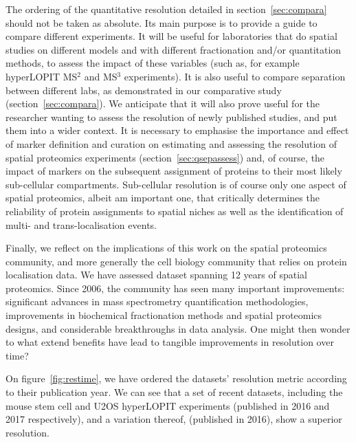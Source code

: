 \documentclass[12pt]{article}\usepackage[]{graphicx}\usepackage[]{color}
\begin{document}
The ordering of the quantitative resolution detailed in
section~\ref{sec:compara} should not be taken as absolute. Its main
purpose is to provide a guide to compare different experiments. It
will be useful for laboratories that do spatial studies on different
models and with different fractionation and/or quantitation methods,
to assess the impact of these variables (such as, for example
hyperLOPIT MS$^2$ and MS$^3$ experiments). It is also useful to
compare separation between different labs, as demonstrated in our
comparative study (section~\ref{sec:compara}). We anticipate that it
will also prove useful for the researcher wanting to assess the
resolution of newly published studies, and put them into a wider
context. It is necessary to emphasise the importance and effect of
marker definition and curation on estimating and assessing the
resolution of spatial proteomics experiments
(section~\ref{sec:qsepassess}) and, of course, the impact of markers
on the subsequent assignment of proteins to their most likely
sub-cellular compartments. Sub-cellular resolution is of course only
one aspect of spatial proteomics, albeit am important one, that
critically determines the reliability of protein assignments to
spatial niches as well as the identification of multi- and
trans-localisation events.

\bigskip

Finally, we reflect on the implications of this work on the spatial
proteomics community, and more generally the cell biology community
that relies on protein localisation data. We have assessed dataset
spanning 12 years of spatial proteomics. Since 2006, the community has
seen many important improvements: significant advances in mass
spectrometry quantification methodologies, improvements in biochemical
fractionation methods and spatial proteomics designs, and considerable
breakthroughs in data analysis. One might then wonder to what extend
benefits have lead to tangible improvements in resolution over time?

On figure~\ref{fig:restime}, we have ordered the datasets' resolution
metric according to their publication year. We can see that a set of
recent datasets, including the mouse stem cell
\citep{Christoforou:2016} and U2OS \citep{Thul:2017} hyperLOPIT
experiments (published in 2016 and 2017 respectively), and a variation
thereof, \citep{JeanBeltran:2016} (published in 2016), show a superior
resolution.
\end{document}
